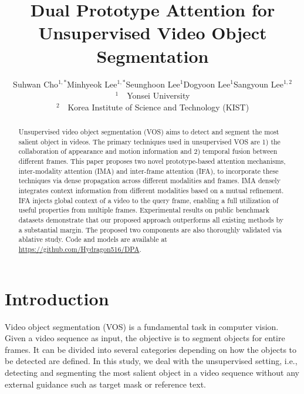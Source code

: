 \documentclass[10pt,twocolumn,letterpaper]{article}
\begin{document}
\title{Dual Prototype Attention for Unsupervised Video Object Segmentation}
\author{Suhwan Cho$^{1,*}$\quad Minhyeok Lee$^{1,*}$\quad Seunghoon Lee$^1$\quad Dogyoon Lee$^1$\quad Sangyoun Lee$^{1,2}$\vspace{0.5cm}\\
$^1$~~Yonsei University\\
$^2$~~Korea Institute of Science and Technology (KIST)}


\maketitle
\def\thefootnote{*}




\begin{abstract}
Unsupervised video object segmentation (VOS) aims to detect and segment the most salient object in videos. The primary techniques used in unsupervised VOS are 1) the collaboration of appearance and motion information and 2) temporal fusion between different frames. This paper proposes two novel prototype-based attention mechanisms, inter-modality attention (IMA) and inter-frame attention (IFA), to incorporate these techniques via dense propagation across different modalities and frames. IMA densely integrates context information from different modalities based on a mutual refinement. IFA injects global context of a video to the query frame, enabling a full utilization of useful properties from multiple frames. Experimental results on public benchmark datasets demonstrate that our proposed approach outperforms all existing methods by a substantial margin. The proposed two components are also thoroughly validated via ablative study. Code and models are available at \url{https://github.com/Hydragon516/DPA}.
\end{abstract}



\section{Introduction}
Video object segmentation (VOS) is a fundamental task in computer vision. Given a video sequence as input, the objective is to segment objects for entire frames. It can be divided into several categories depending on how the objects to be detected are defined. In this study, we deal with the unsupervised setting, i.e., detecting and segmenting the most salient object in a video sequence without any external guidance such as target mask or reference text.
\end{document}
